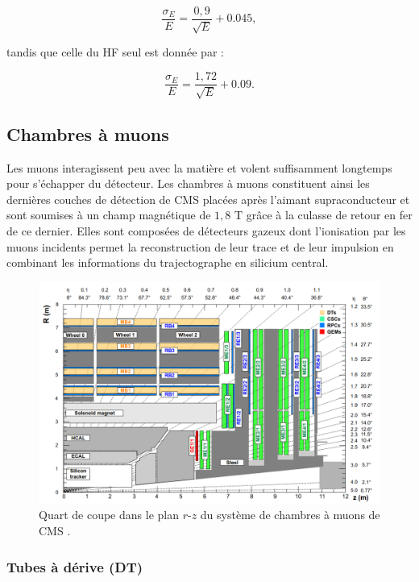 \begin{equation}
    \frac{\sigma_E}{E}=\frac{0,9}{\sqrt{E}}+0.045,
\end{equation}

tandis que celle du HF seul est donnée par :

\begin{equation}
    \frac{\sigma_E}{E}=\frac{1,72}{\sqrt{E}}+0.09.
\end{equation}

\subsection{Chambres à muons}

Les muons interagissent peu avec la matière et volent suffisamment longtemps pour s'échapper du détecteur. Les chambres à muons constituent ainsi les dernières couches de détection de CMS placées après l'aimant supraconducteur et sont soumises à un champ magnétique de $1,8$ T grâce à la culasse de retour en fer de ce dernier. Elles sont composées de détecteurs gazeux dont l'ionisation par les muons incidents permet la reconstruction de leur trace et de leur impulsion en combinant les informations du trajectographe en silicium central. 

\begin{figure}
\centering
    \includegraphics[scale=0.37]{Chapitre3/Images/MUONS.png} 
\caption{Quart de coupe dans le plan $r$-$z$ du système de chambres à muons de CMS \cite{MUONS}.}
\label{muons}
\end{figure}

\subsubsection{ Tubes à dérive (DT)}

